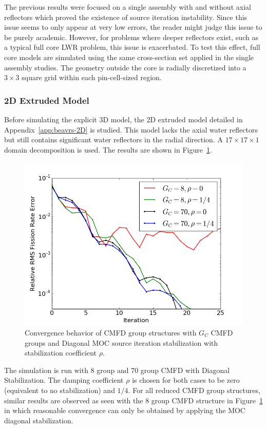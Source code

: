 The previous results were focused on a single assembly with and without axial reflectors which proved the existence of source iteration instability. Since this issue seems to only appear at very low errors, the reader might judge this issue to be purely academic. However, for problems where deeper reflectors exist, such as a typical full core \ac{LWR} problem, this issue is exacerbated. To test this effect, full core models are simulated using the same cross-section set applied in the single assembly studies. The geometry outside the core is radially discretized into a $3 \times 3$ square grid within each pin-cell-sized region.

\subsubsection{2D Extruded Model}

Before simulating the explicit 3D model, the 2D extruded model detailed in Appendix~\ref{app:beavrs-2D} is studied. This model lacks the axial water reflectors but still contains significant water reflectors in the radial direction. A $17 \times 17 \times 1$ domain decomposition is used. The results are shown in Figure~\ref{fig:fc-2D}. 
\begin{figure}[ht!]
	\centering
	\includegraphics[width=0.65\linewidth]{figures/convergence/fc_2D.png}
	\caption{Convergence behavior of \ac{CMFD} group structures with $G_C$ \ac{CMFD} groups and Diagonal \ac{MOC} source iteration stabilization with stabilization coefficient $\rho$.}
	\label{fig:fc-2D}
\end{figure}
The simulation is run with 8 group and 70 group \ac{CMFD} with Diagonal Stabilization. The damping coefficient $\rho$ is chosen for both cases to be zero (equivalent to no stabilization) and $1/4$. For all reduced \ac{CMFD} group structures, similar results are observed as seen with the 8 group \ac{CMFD} structure in Figure~\ref{fig:fc-2D} in which reasonable convergence can only be obtained by applying the \ac{MOC} diagonal stabilization.

